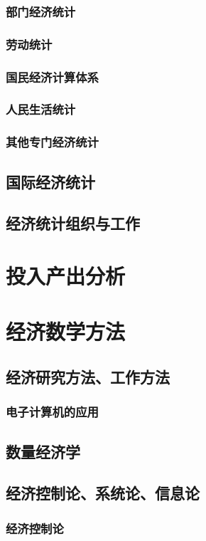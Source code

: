 \documentclass[UTF8]{../../RepresentationUniverse}
\begin{document}
        \subsubsection{部门经济统计}
        \subsubsection{劳动统计}
        \subsubsection{国民经济计算体系}
        \subsubsection{人民生活统计}
        \subsubsection{其他专门经济统计}
    \subsection{国际经济统计}
    \subsection{经济统计组织与工作}

\section{投入产出分析}
\section{经济数学方法}
    \subsection{经济研究方法、工作方法}
        \subsubsection{电子计算机的应用}
    \subsection{数量经济学}
    \subsection{经济控制论、系统论、信息论}
        \subsubsection{经济控制论}
\end{document}
